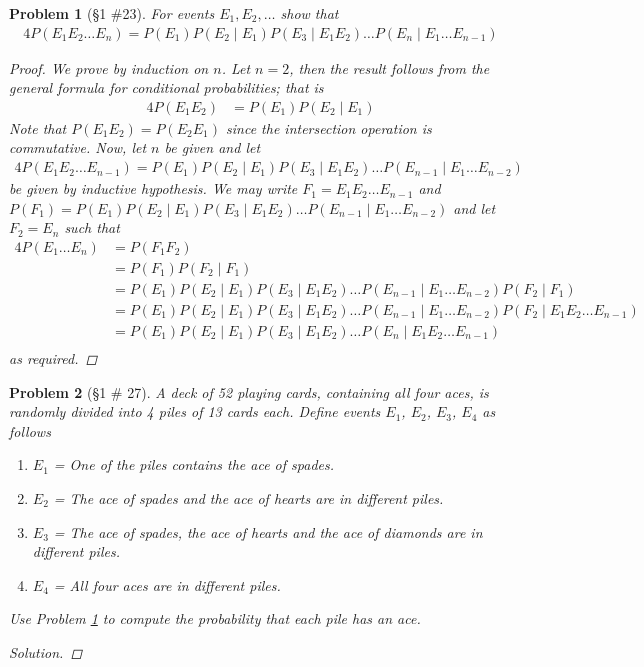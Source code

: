\documentclass[11pt, oneside]{book}   	%
\newtheorem{problem}{Problem}
\begin{document}
\begin{problem}[\S 1 \#23]\label{P1.23}
	For events $E_1, E_2, \dots$ show that 
	\begin{alignat}{4}
		P(E_1E_2\dots E_n)=P(E_1)P(E_2\mid E_1)P(E_3\mid E_1E_2)\dots P(E_n\mid E_1\dots E_{n-1})
	\end{alignat}
	\begin{proof}
		We prove by induction on $n$. Let $n=2$, then the result follows from the general formula for conditional probabilities; that is
		\begin{alignat*}{4}
			P(E_1E_2)&=P(E_1)P(E_2\mid E_1)
		\end{alignat*}
		Note that $P(E_1E_2)=P(E_2E_1)$ since the intersection operation is commutative. Now, let $n$ be given and let 
		\begin{alignat*}{4}
			P(E_1E_2\dots E_{n-1})=P(E_1)P(E_2\mid E_1)P(E_3\mid E_1E_2)\dots P(E_{n-1}\mid E_1\dots E_{n-2})
		\end{alignat*} 
		be given by inductive hypothesis. We may write $F_1=E_1E_2\dots E_{n-1}$ and $P(F_1)=P(E_1)P(E_2\mid E_1)P(E_3\mid E_1E_2)\dots P(E_{n-1}\mid E_1\dots E_{n-2})$ and let $F_2=E_n$ such that 
		\begin{alignat*}{4}
			P(E_1\dots E_n)&=P(F_1F_2) \\
				&=P(F_1)P(F_2\mid F_1) \\
				&=P(E_1)P(E_2\mid E_1)P(E_3\mid E_1E_2)\dots P(E_{n-1}\mid E_1\dots E_{n-2})P(F_2\mid F_1) \\
				&=P(E_1)P(E_2\mid E_1)P(E_3\mid E_1E_2)\dots P(E_{n-1}\mid E_1\dots E_{n-2})P(F_2\mid E_1E_2\dots E_{n-1}) \\
				&=P(E_1)P(E_2\mid E_1)P(E_3\mid E_1E_2)\dots P(E_n\mid E_1E_2\dots E_{n-1}) \\	
		\end{alignat*}
		as required. 
	\end{proof}
\end{problem}

\begin{problem}[\S 1 \# 27]
	A deck of 52 playing cards, containing all four aces, is randomly divided into 4 piles of 13 cards each. Define events $E_1$, $E_2$, $E_3$, $E_4$ as follows
	\begin{enumerate}
		\item $E_1$ = One of the piles contains the ace of spades.
		\item $E_2$ = The ace of spades and the ace of hearts are in different piles.
		\item $E_3$ = The ace of spades, the ace of hearts and the ace of diamonds are in different piles. 
		\item $E_4$ = All four aces are in different piles.
	\end{enumerate}
	Use Problem \ref{P1.23} to compute the probability that each pile has an ace. 
	\begin{proof}[Solution]
	
	\end{proof}
\end{problem}
\end{document}

